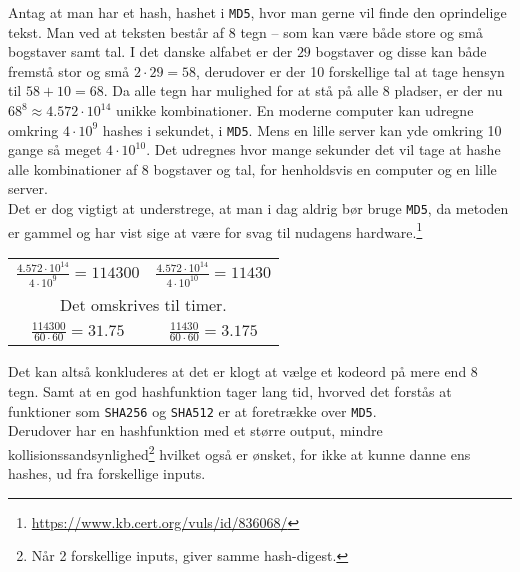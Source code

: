 \begin{eks}
    \label{brutefc}
    Antag at man har et hash, hashet i \texttt{MD5}, hvor man gerne vil finde den oprindelige tekst.
    Man ved at teksten består af 8 tegn -- som kan være både store og små bogstaver samt tal.
    I det danske alfabet er der \(29\) bogstaver og disse kan både fremstå stor og små \(2 \cdot 29 = 58\), derudover er der 10 forskellige tal at tage hensyn til \(58 + 10 = 68\).
    Da alle tegn har mulighed for at stå på alle 8 pladser, er der nu \(68^8\approx 4.572 \cdot 10^{14}\) unikke kombinationer.
    En moderne computer kan udregne omkring \(4 \cdot 10^9\) hashes i sekundet, i \texttt{MD5}.
    Mens en lille server kan yde omkring 10 gange så meget \(4 \cdot 10^{10}\).\cite{ytpwd}
    Det udregnes hvor mange sekunder det vil tage at hashe alle kombinationer af 8 bogstaver og tal, for henholdsvis en computer og en lille server.\\
    Det er dog vigtigt at understrege, at man i dag aldrig bør bruge \texttt{MD5}, da metoden er gammel og har vist sige at være for svag til nudagens hardware.\footnote{\url{https://www.kb.cert.org/vuls/id/836068/}}

    \setlength{\tabcolsep}{50pt} %
    \begin{center}
        \begin{tabular}{c c}

            \(\frac{4.572 \cdot 10^{14}}{4 \cdot 10^9} = 114300\) &
            \(\frac{4.572 \cdot 10^{14}}{4 \cdot 10^{10}} = 11430\)\\

            \multicolumn{2}{c}{Det omskrives til timer.}\\

            \(\frac{114300}{60 \cdot 60} = 31.75\) &
            \(\frac{11430}{60 \cdot 60} = 3.175\)\\

        \end{tabular}
    \end{center}

    Det kan altså konkluderes at det er klogt at vælge et kodeord på mere end 8 tegn.
    Samt at en god hashfunktion tager lang tid, hvorved det forstås at funktioner som \texttt{SHA256} og \texttt{SHA512} er at foretrække over \texttt{MD5}.\\
    Derudover har en hashfunktion med et større output, mindre kollisionssandsynlighed\footnote{Når 2 forskellige inputs, giver samme hash-digest.} hvilket også er ønsket, for ikke at kunne danne ens hashes, ud fra forskellige inputs.
\end{eks}



